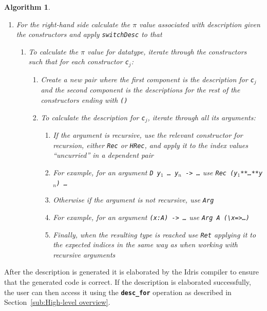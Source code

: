 \documentclass{ituthesis}
\newcommand{\ttconstructor}[1]{\textcolor{constructor-color}{\texttt{#1}}}
\newcommand{\tttype}[1]{\textcolor{type-color}{\texttt{#1}}}
\newcommand{\ttdec}[1]{\textcolor{declared-var-color}{\texttt{#1}}}
\newcommand{\ttvar}[1]{\textcolor{local-var-color}{\texttt{#1}}}
\theoremstyle{break}
\newtheorem{alg}{Algorithm}
\begin{document}
\begin{alg}
\begin{enumerate}
     \item For the right-hand side calculate the $\pi$ value associated with description given the constructors and apply \ttdec{switchDesc} to that
       \begin{enumerate}
         \item To calculate the $\pi$ value for datatype, iterate through the constructors such that for each constructor \ttvar{c$_j$}:
         \begin{enumerate}
           \item Create a new pair where the first component is the description for \ttvar{c$_j$} and the second component is the descriptions for the rest of the constructors ending with \ttconstructor{()}
           \item To calculate the description for \ttvar{c$_j$}, iterate through all its arguments:
           \begin{enumerate}
             \item If the argument is recursive, use the relevant constructor for recursion, either \ttconstructor{Rec} or \ttconstructor{HRec}, and apply it to the index values ``uncurried'' in a dependent pair
             \item[] For example, for an argument \tttype{D}~\ttvar{y$_1$}~\texttt{\ldots}~\ttvar{y$_n$}\texttt{~->~\ldots} use \ttconstructor{Rec}~\ttconstructor{(}\ttvar{y$_1$}\ttconstructor{**}\texttt{\ldots}\ttconstructor{**}\ttvar{y$_n$}\ttconstructor{)}~\texttt{\ldots}
             \item Otherwise if the argument is not recursive, use \ttconstructor{Arg}
             \item[] For example, for an argument \texttt{(}\ttvar{x}\texttt{:}\tttype{A}\texttt{)}\texttt{~->~\ldots} use \ttconstructor{Arg}~\tttype{A}~\texttt{(\textbackslash}\ttvar{x}\texttt{=>\ldots)}
             \item Finally, when the resulting type is reached use \ttconstructor{Ret} applying it to the expected indices in the same way as when working with recursive arguments
           \end{enumerate}
         \end{enumerate}
       \end{enumerate}
  \end{enumerate}
  \label{alg:gendescd}
\end{alg}

After the description is generated it is elaborated by the Idris compiler to ensure that the generated code is correct.
If the description is elaborated successfully, the user can then access it using the \texttt{\textbf{desc\_for}} operation as described in Section~\ref{sub:High-level overview}.
\end{document}
